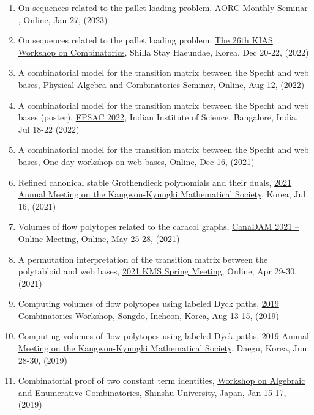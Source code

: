 \documentclass[letterpaper]{article}
\begin{document}
\begin{enumerate}
\item On sequences related to the pallet loading problem, \href{https://swb.skku.edu/aorc/seminar.do?mode=view&articleNo=39837&article.offset=0&articleLimit=10}{AORC Monthly Seminar }, Online, Jan 27, (2023)
\item On sequences related to the pallet loading problem, \href{http://events.kias.re.kr/h/combinatorics/?pageNo=4839}{The 26th KIAS Workshop on Combinatorics}, Shilla Stay Haeundae, Korea, Dec 20-22, (2022)
\item A combinatorial model for the transition matrix between the Specht and web bases, \href{https://tscrim.github.io/pacs_en.html}{Physical Algebra and Combinatorics Seminar}, Online, Aug 12, (2022)
\item A combinatorial model for the transition matrix between the Specht and web bases (poster), \href{https://math.iisc.ac.in/fpsac2022/}{FPSAC 2022}, Indian Institute of Science, Bangalore, India, Jul 18-22 (2022)
\item A combinatorial model for the transition matrix between the Specht and web bases, \href{https://www.kias.re.kr/kias/activities/seminars/list.do?menuNo=404003&eventTy=&schoolsCd=C&centrspgmsCd=&pageIndex=1&sdate=2021-12-15&edate=2021-12-17&mjrcdnm=&searchCnd=1&searchWord=}{One-day workshop on web bases}, Online, Dec 16, (2021)
\item Refined canonical stable Grothendieck polynomials and their duals, \href{http://www.kkms.org/main/main}{2021 Annual Meeting on the Kangwon-Kyungki Mathematical Society}, Korea, Jul 16, (2021)
\item Volumes of flow polytopes related to the caracol graphs, \href{https://2021.canadam.math.ca/}{CanaDAM 2021 – Online Meeting}, Online, May 25-28, (2021)
\item A permutation interpretation of the transition matrix between the polytabloid and web bases, \href{https://www.kms.or.kr/meetings/spring2021/}{2021 KMS Spring Meeting}, Online, Apr 29-30, (2021)
\item Computing volumes of flow polytopes using labeled Dyck paths, \href{https://cw2019.combinatorics.kr/information}{2019 Combinatorics Workshop}, Songdo, Incheon, Korea, Aug 13-15, (2019) 
\item Computing volumes of flow polytopes using labeled Dyck paths, \href{http://www.kkms.org/main/main}{2019 Annual Meeting on the Kangwon-Kyungki Mathematical Society}, Daegu, Korea, Jun 28-30, (2019) 
\item Combinatorial proof of two constant term identities, \href{http://math.shinshu-u.ac.jp/~nu/html/workshop/20190115-shinshu/}{Workshop on Algebraic and Enumerative Combinatorics}, Shinshu University, Japan, Jan 15-17, (2019)
\end{enumerate}
\end{document}
